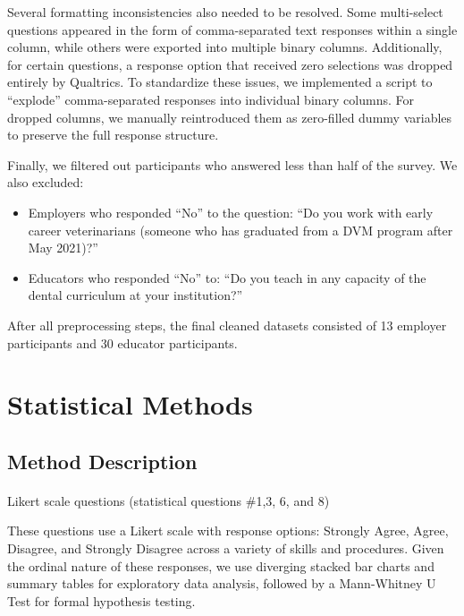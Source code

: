 \documentclass[
  11pt,
  letterpaper,
  DIV=11,
  numbers=noendperiod]{scrartcl}
\makeatletter
\let\oldparagraph\paragraph
\renewcommand{\paragraph}{
    \@ifstar
      \xxxParagraphStar
      \xxxParagraphNoStar
  }
\newcommand{\xxxParagraphStar}[1]{\oldparagraph*{#1}\mbox{}}
\newcommand{\xxxParagraphNoStar}[1]{\oldparagraph{#1}\mbox{}}
\numberwithin{figure}{section}
\makeatother
\begin{document}
Several formatting inconsistencies also needed to be resolved. Some
multi-select questions appeared in the form of comma-separated text
responses within a single column, while others were exported into
multiple binary columns. Additionally, for certain questions, a response
option that received zero selections was dropped entirely by Qualtrics.
To standardize these issues, we implemented a script to ``explode''
comma-separated responses into individual binary columns. For dropped
columns, we manually reintroduced them as zero-filled dummy variables to
preserve the full response structure.

Finally, we filtered out participants who answered less than half of the
survey. We also excluded:

\begin{itemize}
\item
  Employers who responded ``No'' to the question: ``Do you work with
  early career veterinarians (someone who has graduated from a DVM
  program after May 2021)?''
\item
  Educators who responded ``No'' to: ``Do you teach in any capacity of
  the dental curriculum at your institution?''
\end{itemize}

After all preprocessing steps, the final cleaned datasets consisted of
13 employer participants and 30 educator participants.

\section{Statistical Methods}\label{statistical-methods}

\subsection{Method Description}\label{method-description}

\paragraph{Likert scale questions (statistical questions \#1,3, 6, and
8)}\label{likert-scale-questions-statistical-questions-13-6-and-8}

These questions use a Likert scale with response options: Strongly
Agree, Agree, Disagree, and Strongly Disagree across a variety of skills
and procedures. Given the ordinal nature of these responses, we use
diverging stacked bar charts and summary tables for exploratory data
analysis, followed by a Mann-Whitney U Test for formal hypothesis
testing.
\end{document}
